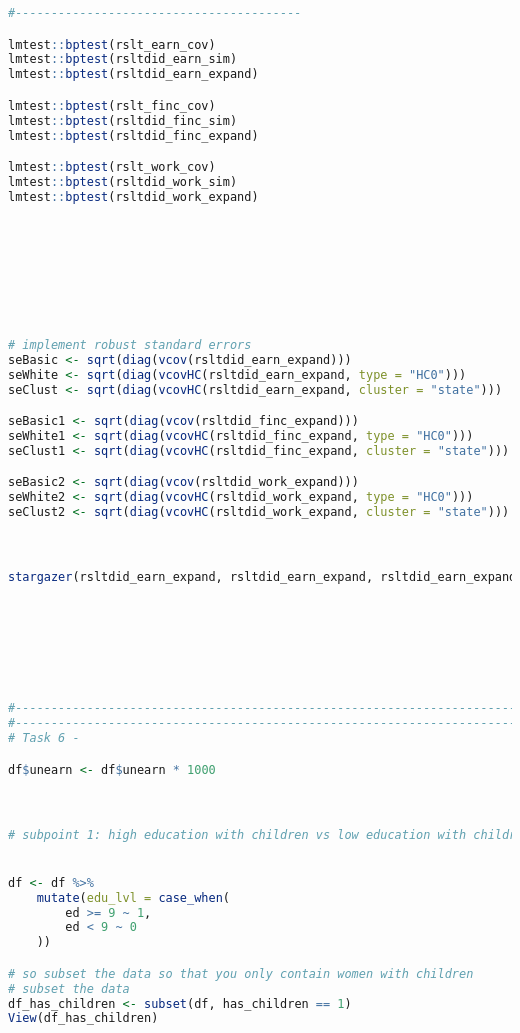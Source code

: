 \documentclass[a4paper]{article}
\begin{document}
\begin{lstlisting}[language=R]
#----------------------------------------

lmtest::bptest(rslt_earn_cov)
lmtest::bptest(rsltdid_earn_sim)
lmtest::bptest(rsltdid_earn_expand)

lmtest::bptest(rslt_finc_cov)
lmtest::bptest(rsltdid_finc_sim)
lmtest::bptest(rsltdid_finc_expand)

lmtest::bptest(rslt_work_cov)
lmtest::bptest(rsltdid_work_sim)
lmtest::bptest(rsltdid_work_expand)








# implement robust standard errors
seBasic <- sqrt(diag(vcov(rsltdid_earn_expand)))
seWhite <- sqrt(diag(vcovHC(rsltdid_earn_expand, type = "HC0")))
seClust <- sqrt(diag(vcovHC(rsltdid_earn_expand, cluster = "state")))

seBasic1 <- sqrt(diag(vcov(rsltdid_finc_expand)))
seWhite1 <- sqrt(diag(vcovHC(rsltdid_finc_expand, type = "HC0")))
seClust1 <- sqrt(diag(vcovHC(rsltdid_finc_expand, cluster = "state")))

seBasic2 <- sqrt(diag(vcov(rsltdid_work_expand)))
seWhite2 <- sqrt(diag(vcovHC(rsltdid_work_expand, type = "HC0")))
seClust2 <- sqrt(diag(vcovHC(rsltdid_work_expand, cluster = "state")))



stargazer(rsltdid_earn_expand, rsltdid_earn_expand, rsltdid_earn_expand, rsltdid_finc_expand, rsltdid_finc_expand, rsltdid_finc_expand, rsltdid_work_expand, rsltdid_work_expand, rsltdid_work_expand, se = list(seBasic, seWhite, seClust, seBasic1, seWhite1, seClust1, seBasic2, seWhite2, seClust2), type = "latex")







#---------------------------------------------------------------------------------------
#---------------------------------------------------------------------------------------
# Task 6 -

df$unearn <- df$unearn * 1000



# subpoint 1: high education with children vs low education with children


df <- df %>%
    mutate(edu_lvl = case_when(
        ed >= 9 ~ 1,
        ed < 9 ~ 0
    ))

# so subset the data so that you only contain women with children
# subset the data
df_has_children <- subset(df, has_children == 1)
View(df_has_children)




\end{lstlisting}
\end{document}
